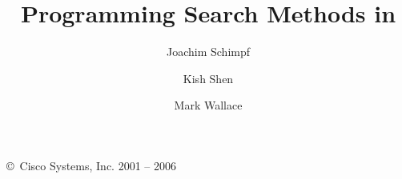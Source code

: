 \documentclass[11pt,a4paper]{article}
\begin{document}
\title{{\Huge Programming Search Methods in { \eclipse} }}
\author{Joachim Schimpf \and Kish Shen \and Mark Wallace}

\maketitle

\pagestyle{empty}

\vfill
\copyright\ Cisco Systems, Inc. 2001 -- 2006

\bigskip\bigskip\bigskip\bigskip\bigskip\bigskip

\cleardoublepage
\begin{latexonly}
\tableofcontents
\end{latexonly}

\cleardoublepage


%
%
%
%
%
%



\newpage

\newpage


\end{document}
